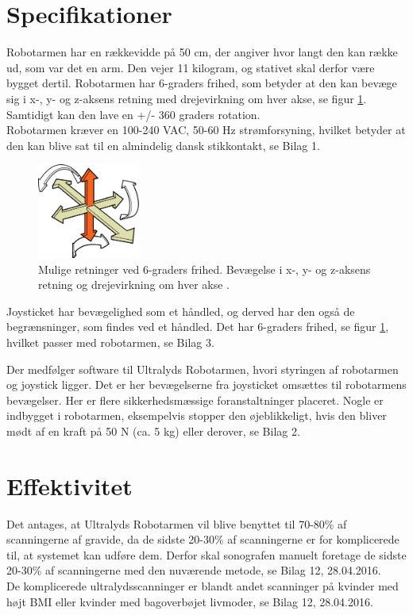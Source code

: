 \newpage
\section{Specifikationer}
Robotarmen har en rækkevidde på 50 cm, der angiver hvor langt den kan række ud, som var det en arm. Den vejer 11 kilogram, og stativet skal derfor være bygget dertil. Robotarmen har 6-graders frihed, som betyder at den kan bevæge sig i x-, y- og z-aksens retning med drejevirkning om hver akse, se figur \ref{seksgradersfrihed}. Samtidigt kan den lave en +/- 360 graders rotation. \\
Robotarmen kræver en 100-240 VAC, 50-60 Hz strømforsyning, hvilket betyder at den kan blive sat til en almindelig dansk stikkontakt, se Bilag 1.
\begin{figure}[H]\centering
	\includegraphics[width = 0.3\textwidth]{Figurer/sixDegressOfFreedom.jpg}
	\caption{Mulige retninger ved 6-graders frihed. Bevægelse i x-, y- og z-aksens retning og drejevirkning om hver akse \cite{6gradersfrihed}. }
	\label{seksgradersfrihed}
\end{figure}
Joysticket har bevægelighed som et håndled, og derved har den også de begrænsninger, som findes ved et håndled. Det har 6-graders frihed, se figur \ref{seksgradersfrihed}, hvilket passer med robotarmen, se Bilag 3. 

Der medfølger software til Ultralyds Robotarmen, hvori styringen af robotarmen og joystick ligger. Det er her bevægelserne fra joysticket omsættes til robotarmens bevægelser. Her er flere sikkerhedsmæssige foranstaltninger placeret. Nogle er indbygget i robotarmen, eksempelvis stopper den øjeblikkeligt, hvis den bliver mødt af en kraft på 50 N (ca. 5 kg) eller derover, se Bilag 2.    

\section{Effektivitet}
Det antages, at Ultralyds Robotarmen vil blive benyttet til 70-80\% af scanningerne af gravide, da de sidste 20-30\% af scanningerne er for komplicerede til, at systemet kan udføre dem. Derfor skal sonografen manuelt foretage de sidste 20-30\% af scanningerne med den nuværende metode, se Bilag 12, 28.04.2016. \\ 
De komplicerede ultralydsscanninger er blandt andet scanninger på kvinder med højt BMI eller kvinder med bagoverbøjet livmoder, se Bilag 12, 28.04.2016. 
 
